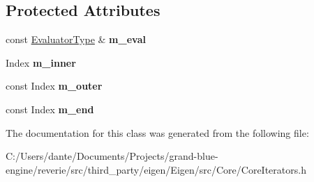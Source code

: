 \subsection*{Protected Attributes}
\begin{DoxyCompactItemize}
\item 
\mbox{\label{class_eigen_1_1internal_1_1inner__iterator__selector_3_01_xpr_type_00_01_index_based_01_4_af440cf9df6a9592baee4673fcd3e291a}} 
const \mbox{\hyperlink{struct_eigen_1_1internal_1_1evaluator}{Evaluator\+Type}} \& {\bfseries m\+\_\+eval}
\item 
\mbox{\label{class_eigen_1_1internal_1_1inner__iterator__selector_3_01_xpr_type_00_01_index_based_01_4_a84ff8216682727607016682df381d6dd}} 
Index {\bfseries m\+\_\+inner}
\item 
\mbox{\label{class_eigen_1_1internal_1_1inner__iterator__selector_3_01_xpr_type_00_01_index_based_01_4_a882c0a7787a1b0a6ad0b19e133c20a69}} 
const Index {\bfseries m\+\_\+outer}
\item 
\mbox{\label{class_eigen_1_1internal_1_1inner__iterator__selector_3_01_xpr_type_00_01_index_based_01_4_ade2963f6fe06b1f2e246d7d6a48c6fb9}} 
const Index {\bfseries m\+\_\+end}
\end{DoxyCompactItemize}


The documentation for this class was generated from the following file\+:\begin{DoxyCompactItemize}
\item 
C\+:/\+Users/dante/\+Documents/\+Projects/grand-\/blue-\/engine/reverie/src/third\+\_\+party/eigen/\+Eigen/src/\+Core/Core\+Iterators.\+h\end{DoxyCompactItemize}
